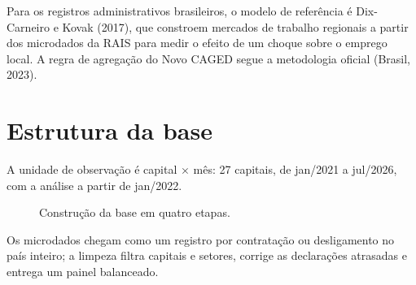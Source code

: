 Para os registros administrativos brasileiros, o modelo de referência é Dix-Carneiro e Kovak (2017), que
constroem mercados de trabalho regionais a partir dos microdados da RAIS para medir o efeito de um choque
sobre o emprego local. A regra de agregação do Novo CAGED segue a metodologia oficial (Brasil, 2023).


\section{Estrutura da base}

A unidade de observação é capital $\times$ mês: 27 capitais, de jan/2021 a jul/2026, com a análise
a partir de jan/2022.

\begin{figure}[H]
\centering
{}
\caption{Construção da base em quatro etapas.}
\end{figure}

Os microdados chegam como um registro por contratação ou desligamento no país inteiro; a limpeza
filtra capitais e setores, corrige as declarações atrasadas e entrega um painel balanceado.

